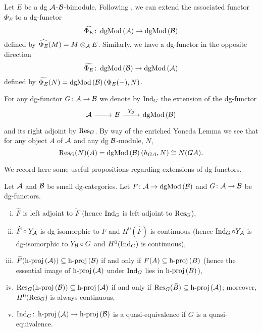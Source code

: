 Let \(E\) be a dg \(\mathcal{A}\)-\(\mathcal{B}\)-bimodule.
Following \textcite[Section 3]{CS15}, we can extend the associated functor \(\Phi_E\) to a dg-functor
\[\widehat{\Phi_E} \colon \operatorname{dgMod}\left(\mathcal{A}\right) \to \operatorname{dgMod}\left(\mathcal{B}\right)\]
defined by \(\widehat{\Phi_E}(M) = M \otimes_{\mathcal{A}} E\).
Similarly, we have a dg-functor in the opposite direction
\[\widetilde{\Phi_E} \colon \operatorname{dgMod}\left(\mathcal{B}\right) \to \operatorname{dgMod}\left(\mathcal{A}\right)\]
defined by \(\widetilde{\Phi_E}(N) = \operatorname{dgMod}\left(\mathcal{B}\right)(\Phi_E( - ), N)\).

For any dg-functor \(G \colon \mathcal{A} \to \mathcal{B}\) we denote by \(\operatorname{Ind}_{G}\) the extension of the dg-functor
\[\begin{tikzcd}
\A  \arrow{r} & \B \arrow{r}{Y_\B} & \dgMod{\B}
\end{tikzcd}\]
and its right adjoint by \(\operatorname{Res}_{G}\).
By way of the enriched Yoneda Lemma we see that for any object \(A\) of \(\mathcal{A}\) and any dg \(\mathcal{B}\)-module, \(N\), 
\[\operatorname{Res}_{G}(N)(A) = \operatorname{dgMod}\left(\mathcal{B}\right)(h_{GA}, N) \cong N(GA).\]

We record here some useful propositions regarding extensions of dg-functors.

\begin{proposition}[{\textcite[Prop 3.2]{CS15}}]
  Let \(\mathcal{A}\) and \(\mathcal{B}\) be small dg-categories.
  Let \(F \colon \mathcal{A} \to \operatorname{dgMod}\left(\mathcal{B}\right)\) and \(G \colon \mathcal{A} \to \mathcal{B}\) be dg-functors.
  \begin{enumerate}[(i)]
  \item
    \(\widehat{F}\) is left adjoint to \(\widetilde{F}\) (hence \(\operatorname{Ind}_{G}\) is left adjoint to \(\operatorname{Res}_{G}\)),
  \item
    \(\widehat{F} \circ Y_{\mathcal{A}}\) is dg-isomorphic to \(F\) and \(H^0(\widehat{F})\) is continuous (hence \(\operatorname{Ind}_{G} \circ Y_{\mathcal{A}}\) is dg-isomorphic to \(Y_{\mathcal{B}} \circ G\) and \(H^0(\operatorname{Ind}_{G})\) is continuous),
  \item
    \(\widehat{F}(\operatorname{h-proj}\left(\mathcal{A}\right)) \subseteq \operatorname{h-proj}\left(\mathcal{B}\right)\) if and only if \(F(A) \subseteq \operatorname{h-proj}\left(B\right)\) (hence the essential image of \(\operatorname{h-proj}\left(\mathcal{A}\right)\) under \(\operatorname{Ind}_{G}\) lies in \(\operatorname{h-proj}\left(B\right)\)),
  \item
    \(\operatorname{Res}_{G}(\operatorname{h-proj}\left(\mathcal{B}\right)) \subseteq \operatorname{h-proj}\left(\mathcal{A}\right)\) if and only if \(\operatorname{Res}_{G}(\bar{B}) \subseteq \operatorname{h-proj}\left(\mathcal{A}\right)\); moreover,\\ \(H^0(\operatorname{Res}_{G})\) is always continuous,
  \item
    \(\operatorname{Ind}_{G} \colon \operatorname{h-proj}\left(\mathcal{A}\right) \to \operatorname{h-proj}\left(\mathcal{B}\right)\) is a quasi-equivalence if \(G\) is a quasi-equivalence.
  \end{enumerate}
\end{proposition}

